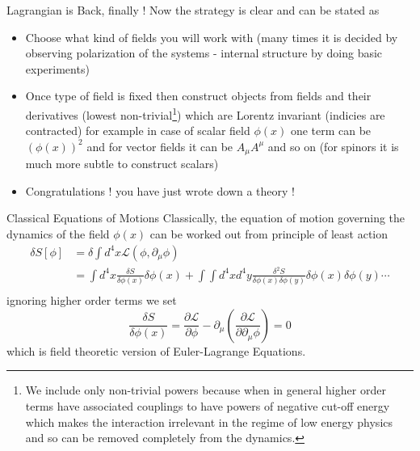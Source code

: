 \documentclass{beamer}
\begin{document}
\begin{frame}{Lagrangian is Back, finally !}
    Now the strategy is clear and can be stated as
    \begin{itemize}
        \item Choose what kind of fields you will work with (many times it is decided by observing polarization of the systems - internal structure by doing basic experiments)
        \item Once type of field is fixed then construct objects from fields and their derivatives (lowest non-trivial\footnote{We include only non-trivial powers because when in general higher order terms have associated couplings to have powers of negative cut-off energy which makes the interaction irrelevant in the regime of low energy physics and so can be removed completely from the dynamics.}) which are Lorentz invariant (indicies are contracted) for example in case of scalar field $\phi(x)$ one term can be $(\phi(x))^{2}$ and for vector fields it can be $A_{\mu}A^{\mu}$ and so on (for spinors it is much more subtle to construct scalars)
        \item Congratulations ! you have just wrote down a theory ! 
    \end{itemize}
\end{frame}
\begin{frame}{Classical Equations of Motions}
Classically, the equation of motion governing the dynamics of the field $\phi(x)$ can be worked out from principle of least action 
\begin{align}
    \delta S[\phi] &= \delta \int d^{4}x \mathcal{L}(\phi, \partial_{\mu}\phi) \\
                   &= \int d^{4}x \frac{\delta S}{\delta\phi(x)}\delta\phi(x) + \int\int d^{4}xd^{4}y \frac{\delta^{2} S}{\delta \phi(x)\delta\phi(y)}\delta\phi(x)\delta\phi(y)\cdots \\
\end{align} ignoring higher order terms we set 
\begin{equation}
    \frac{\delta S}{\delta \phi(x)} = \frac{\partial\mathcal{L}}{\partial\phi} - \partial_{\mu}(\frac{\partial\mathcal{L}}{\partial\partial_{\mu}\phi}) = 0
\end{equation} which is field theoretic version of Euler-Lagrange Equations.
\end{frame}
\end{document}
